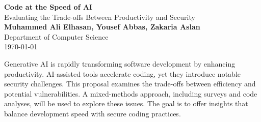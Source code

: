 \documentclass{assets/proposal}
\begin{document}
\begin{titlepage}
    \centering
    \vspace*{3cm} %
    {\Huge \textbf{Code at the Speed of AI}} \\[0.5cm]
    {\Large Evaluating the Trade-offs Between Productivity and Security} \\[2cm]
    {\Large \textbf{Muhammed Ali Elhasan, Yousef Abbas, Zakaria Aslan}} \\[0.3cm]
    {\large Department of Computer Science} \\[0.3cm]
    {\large \universityname} 
    \vfill
    {\large \today} %
\end{titlepage}

\begin{multicols}{2}

\begin{customabstract} Generative AI is rapidly transforming software development by enhancing productivity.
AI-assisted tools accelerate coding, yet they introduce notable security challenges.
This proposal examines the trade-offs between efficiency and potential vulnerabilities.
A mixed-methods approach, including surveys and code analyses, will be used to explore these issues.
The goal is to offer insights that balance development speed with secure coding practices. \end{customabstract}










\end{multicols}

\onecolumn
\printbibliography
\end{document}

